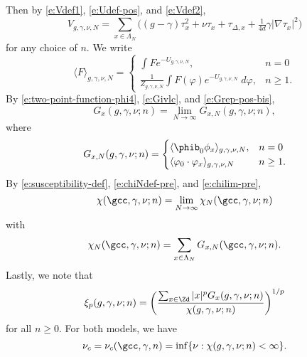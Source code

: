 Then by \eqref{e:Vdef1}, \eqref{e:Udef-pos}, and \eqref{e:Vdef2},
\begin{equation}
V_{g,\gamma,\nu,N}
	=
\sum_{x\in\Lambda_N}
\Big(
	(g - \gamma) \tau_x^2 + \nu \tau_x + \tau_{\Delta,x} + \tfrac{1}{4 d} \gamma |\nabla\tau_x|^2
\Big)
\end{equation}
for any choice of $n$.
We write
\begin{equation}
\langle F \rangle_{g,\gamma,\nu,N}
	=
\begin{cases}
\displaystyle \int F e^{-U_{g,\gamma,\nu,N}},           & n = 0 \\
\displaystyle \frac{1}{Z_{g,\gamma,\nu,N}}
	\int F(\varphi) e^{-U_{g,\gamma,\nu,N}} \; d\varphi,  & n \ge 1.
\end{cases}
\end{equation}
By \eqref{e:two-point-function-phi4}, \eqref{e:Givlc}, and \eqref{e:Grep-pos-bis},
\begin{equation}
G_x(g, \gamma, \nu; n) = \lim_{N\to\infty} G_{x,N}(g, \gamma, \nu; n),
\end{equation}
where
\begin{equation}
G_{x,N}(g, \gamma, \nu; n)
	=
\begin{cases}
\langle \phib_0 \phi_x \rangle_{g,\gamma,\nu,N},      & n = 0 \\
\langle \varphi_0 \cdot \varphi_x \rangle_{g,\gamma,\nu,N}  & n \ge 1.
\end{cases}
\end{equation}
By \eqref{e:susceptibility-def}, \eqref{e:chiNdef-pre}, and \eqref{e:chilim-pre},
\begin{equation}
\label{e:chilim}
\chi(\gcc, \gamma, \nu; n)
	=
\lim_{N\to\infty} \chi_N(\gcc, \gamma, \nu; n)
\end{equation}
with
\begin{equation}
\label{e:chiNdef}
\chi_N(\gcc, \gamma, \nu; n)
	=
\sum_{x\in\Lambda_N} G_{x,N}(\gcc, \gamma, \nu; n).
\end{equation}
Lastly, we note that
\begin{equation}
\label{e:clp}
\xi_p(g, \gamma, \nu; n)
	=
\left(\frac{\sum_{x\in\Zd} |x|^p G_x(g, \gamma, \nu; n)}{\chi(g, \gamma, \nu; n)}\right)^{1/p}
\end{equation}
for all $n \ge 0$.
For both models, we have
\begin{equation}
\label{e:nuc-def}
\nu_c = \nu_c(\gcc, \gamma, n) = \inf \{ \nu : \chi(g, \gamma, \nu; n) < \infty \}.
\end{equation}

